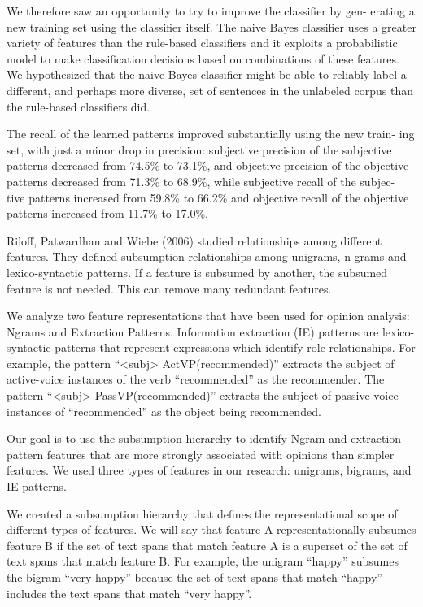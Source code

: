 We therefore saw an opportunity to try to improve the classifier by
gen- erating a new training set using the classifier itself. The naive
Bayes classifier uses a greater variety of features than the
rule-based classifiers and it exploits a probabilistic model to make
classification decisions based on combinations of these features. We
hypothesized that the naive Bayes classifier might be able to reliably
label a different, and perhaps more diverse, set of sentences in the
unlabeled corpus than the rule-based classifiers did.

The recall of the learned patterns improved substantially using the
new train- ing set, with just a minor drop in precision: subjective
precision of the subjective patterns decreased from 74.5\% to 73.1\%,
and objective precision of the objective patterns decreased from
71.3\% to 68.9\%, while subjective recall of the subjec- tive patterns
increased from 59.8\% to 66.2\% and objective recall of the objective
patterns increased from 11.7\% to 17.0\%.


Riloff, Patwardhan and Wiebe (2006) studied relationships among
different features. They defined subsumption relationships among
unigrams, n-grams and lexico-syntactic patterns. If a feature is
subsumed by another, the subsumed feature is not needed. This can
remove many redundant features.

We analyze two feature representations that have been used for opinion
analysis: Ngrams and Extraction Patterns. Information extraction (IE)
patterns are lexico-syntactic patterns that represent expressions
which identify role relationships.  For example, the pattern ``<subj>
ActVP(recommended)'' extracts the subject of active-voice instances of
the verb ``recommended'' as the recommender.  The pattern ``<subj>
PassVP(recommended)'' extracts the subject of passive-voice instances
of ``recommended'' as the object being recommended.

Our goal is to use the subsumption hierarchy to identify Ngram and
extraction pattern features that are more strongly associated with
opinions than simpler features. We used three types of features in our
research: unigrams, bigrams, and IE patterns.

We created a subsumption hierarchy that defines the representational
scope of different types of features. We will say that feature A
representationally subsumes feature B if the set of text spans that
match feature A is a superset of the set of text spans that match
feature B. For example, the unigram ``happy'' subsumes the bigram
``very happy'' because the set of text spans that match ``happy''
includes the text spans that match ``very happy''.

